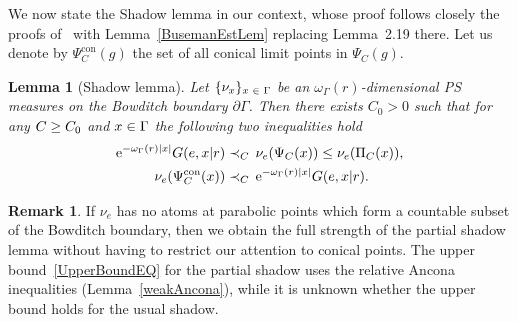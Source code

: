 \documentclass[10pt,a4paper]{amsart}
\newcommand{\pG}{\partial{\Gamma}}
\newcommand{\rme}{\mathrm{e}}
\DeclareMathOperator{\con}{con}
\let\oldin\in
\renewcommand{\in}{\mathchoice{\oldin}{\oldin}{\,\oldin\,}{\,\oldin\,}}
\let\oldge\ge
\renewcommand{\ge}{\mathchoice{\oldge}{\oldge}{\,\oldge\,}{\,\oldge\,}}
\let\oldle\le
\renewcommand{\le}{\mathchoice{\oldle}{\oldle}{\,\oldle\,}{\,\oldle\,}}
\newtheorem{lemm}[theo]{Lemma}
\theoremstyle{definition}\newtheorem{defi}[theo]{Definition}
\newtheorem{rema}[theo]{Remark}
\begin{document}
We now state the Shadow lemma in our context, whose proof follows closely the proofs of~\cite[Lemmas~4.1 \& 4.2]{YangPS} with Lemma~\ref{BusemanEstLem} replacing Lemma~2.19 there. Let us denote by $\Psi^{\con}_C(g)$ the set of all conical limit points in $\Psi_C(g)$.

\begin{lemm}[Shadow lemma]\label{ShadowLem}
Let $\{\nu_x\}_{x \in \Gamma}$ be an $\omega_\Gamma(r)$-dimensional PS measures on the Bowditch boundary $\pG$. Then there exists $C_0> 0$ such that for any $C\ge C_0$ and $x\in \Gamma$ the following two inequalities hold
\begin{align}
\rme^{-\omega_\Gamma(r) |x|}G(e,x|r) &\prec_C \, \nu_e(\Psi_{C}(x))\le \nu_e(\Pi_{C}(x)),\label{LowBoundEQ}\\
\nu_e(\Psi^{\con}_{C}(x)) &\prec_C \, \rme^{-\omega_\Gamma(r) |x|} G(e,x|r).\label{UpperBoundEQ}
\end{align}
\end{lemm}

\begin{rema}
If $\nu_e$ has no atoms at parabolic points which form a countable subset of the Bowditch boundary, then we obtain the full strength of the partial shadow lemma without having to restrict our attention to conical points. The upper bound~\eqref{UpperBoundEQ} for the partial shadow uses the relative Ancona inequalities (Lemma~\ref{weakAncona}), while it is unknown whether the upper bound holds for the usual shadow.
\end{rema}
\end{document}
